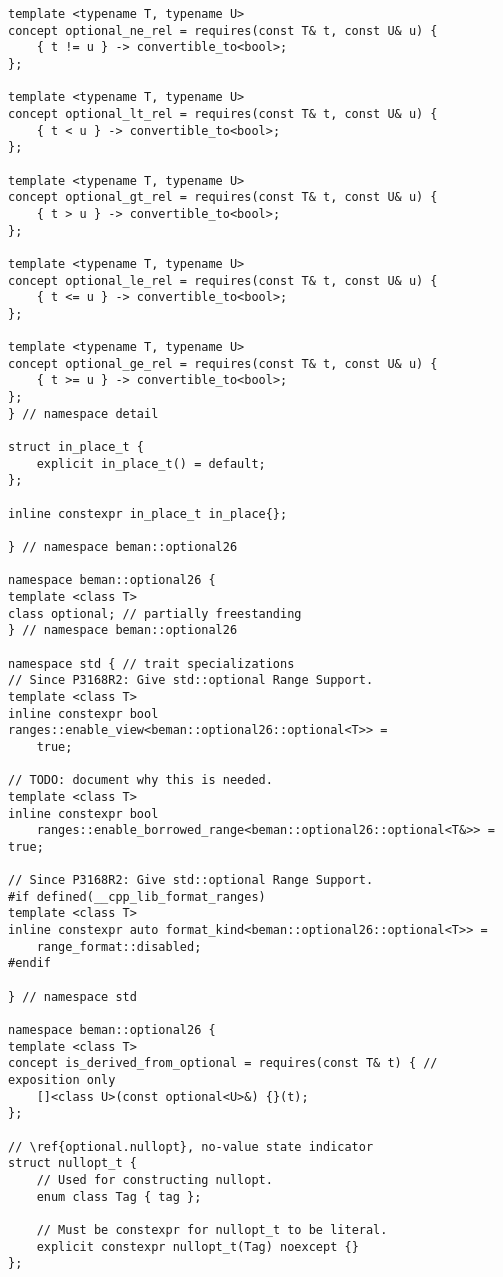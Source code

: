 \documentclass[a4paper,10pt,oneside,openany,final,article]{memoir}
\begin{document}
\begin{verbatim}
template <typename T, typename U>
concept optional_ne_rel = requires(const T& t, const U& u) {
    { t != u } -> convertible_to<bool>;
};

template <typename T, typename U>
concept optional_lt_rel = requires(const T& t, const U& u) {
    { t < u } -> convertible_to<bool>;
};

template <typename T, typename U>
concept optional_gt_rel = requires(const T& t, const U& u) {
    { t > u } -> convertible_to<bool>;
};

template <typename T, typename U>
concept optional_le_rel = requires(const T& t, const U& u) {
    { t <= u } -> convertible_to<bool>;
};

template <typename T, typename U>
concept optional_ge_rel = requires(const T& t, const U& u) {
    { t >= u } -> convertible_to<bool>;
};
} // namespace detail

struct in_place_t {
    explicit in_place_t() = default;
};

inline constexpr in_place_t in_place{};

} // namespace beman::optional26

namespace beman::optional26 {
template <class T>
class optional; // partially freestanding
} // namespace beman::optional26

namespace std { // trait specializations
// Since P3168R2: Give std::optional Range Support.
template <class T>
inline constexpr bool ranges::enable_view<beman::optional26::optional<T>> =
    true;

// TODO: document why this is needed.
template <class T>
inline constexpr bool
    ranges::enable_borrowed_range<beman::optional26::optional<T&>> = true;

// Since P3168R2: Give std::optional Range Support.
#if defined(__cpp_lib_format_ranges)
template <class T>
inline constexpr auto format_kind<beman::optional26::optional<T>> =
    range_format::disabled;
#endif

} // namespace std

namespace beman::optional26 {
template <class T>
concept is_derived_from_optional = requires(const T& t) { // exposition only
    []<class U>(const optional<U>&) {}(t);
};

// \ref{optional.nullopt}, no-value state indicator
struct nullopt_t {
    // Used for constructing nullopt.
    enum class Tag { tag };

    // Must be constexpr for nullopt_t to be literal.
    explicit constexpr nullopt_t(Tag) noexcept {}
};


\end{verbatim}
\end{document}
